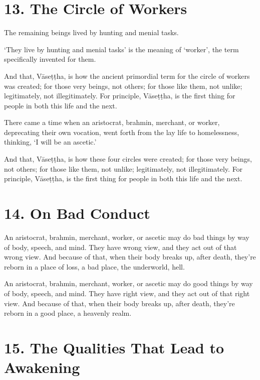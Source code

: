 \documentclass[12pt,openany]{book}%
\begin{document}
\section*{13. The Circle of Workers }

The remaining beings lived by hunting and menial tasks. 

‘They live by hunting and menial tasks’ is the meaning of ‘worker’, the term specifically invented for them. 

And that, \textsanskrit{Vāseṭṭha}, is how the ancient primordial term for the circle of workers was created; for those very beings, not others; for those like them, not unlike; legitimately, not illegitimately. For principle, \textsanskrit{Vāseṭṭha}, is the first thing for people in both this life and the next. 

There came a time when an aristocrat, brahmin, merchant, or worker, deprecating their own vocation, went forth from the lay life to homelessness, thinking, ‘I will be an ascetic.’ 

And that, \textsanskrit{Vāseṭṭha}, is how these four circles were created; for those very beings, not others; for those like them, not unlike; legitimately, not illegitimately. For principle, \textsanskrit{Vāseṭṭha}, is the first thing for people in both this life and the next. 

\section*{14. On Bad Conduct }

An aristocrat, brahmin, merchant, worker, or ascetic may do bad things by way of body, speech, and mind. They have wrong view, and they act out of that wrong view. And because of that, when their body breaks up, after death, they’re reborn in a place of loss, a bad place, the underworld, hell. 

An aristocrat, brahmin, merchant, worker, or ascetic may do good things by way of body, speech, and mind. They have right view, and they act out of that right view. And because of that, when their body breaks up, after death, they’re reborn in a good place, a heavenly realm. 

\section*{15. The Qualities That Lead to Awakening }
\end{document}
